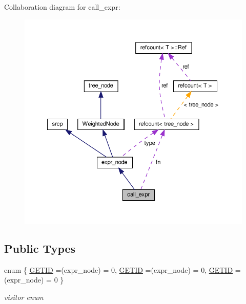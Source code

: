 Collaboration diagram for call\+\_\+expr\+:
\nopagebreak
\begin{figure}[H]
\begin{center}
\leavevmode
\includegraphics[width=350pt]{da/d29/structcall__expr__coll__graph}
\end{center}
\end{figure}
\subsection*{Public Types}
\begin{DoxyCompactItemize}
\item 
enum \{ \hyperlink{structcall__expr_a71e4248b2423d56f511e49902f4c4a57a1e24e9fe35861ab5029ca7cecc8e6bb3}{G\+E\+T\+ID} =(expr\+\_\+node) = 0, 
\hyperlink{structcall__expr_a71e4248b2423d56f511e49902f4c4a57a1e24e9fe35861ab5029ca7cecc8e6bb3}{G\+E\+T\+ID} =(expr\+\_\+node) = 0, 
\hyperlink{structcall__expr_a71e4248b2423d56f511e49902f4c4a57a1e24e9fe35861ab5029ca7cecc8e6bb3}{G\+E\+T\+ID} =(expr\+\_\+node) = 0
 \}\begin{DoxyCompactList}\small\item\em visitor enum \end{DoxyCompactList}
\end{DoxyCompactItemize}

